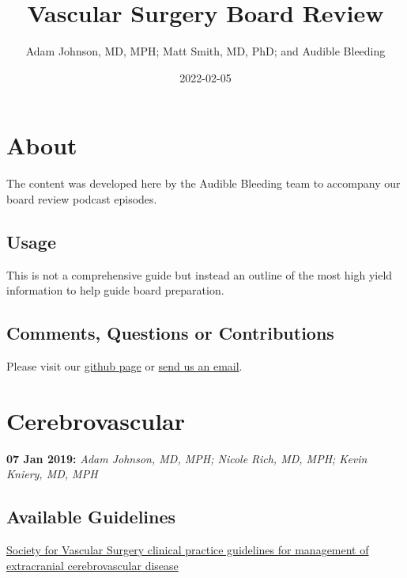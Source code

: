 \documentclass[
]{book}
\title{Vascular Surgery Board Review}
\author{Adam Johnson, MD, MPH; Matt Smith, MD, PhD; and Audible Bleeding}
\date{2022-02-05}
\begin{document}
\maketitle

{
\setcounter{tocdepth}{1}
\tableofcontents
}
\hypertarget{about}{%
\chapter{About}\label{about}}

The content was developed here by the Audible Bleeding team to accompany our board review podcast episodes.

\hypertarget{usage}{%
\section{Usage}\label{usage}}

This is not a comprehensive guide but instead an outline of the most high yield information to help guide board preparation.

\hypertarget{comments-questions-or-contributions}{%
\section{Comments, Questions or Contributions}\label{comments-questions-or-contributions}}

Please visit our \href{https://github.com/adam-mdmph/VS-Board-Review}{github page} or \href{mailto:audiblebleeding@vascularsociety.org}{send us an email}.

\hypertarget{cerebrovascular}{%
\chapter{Cerebrovascular}\label{cerebrovascular}}

\textbf{07 Jan 2019:} \emph{Adam Johnson, MD, MPH; Nicole Rich, MD, MPH; Kevin
Kniery, MD, MPH}

\hypertarget{available-guidelines}{%
\section{Available Guidelines}\label{available-guidelines}}

\href{https://www.jvascsurg.org/article/S0741-5214(21)00893-4/fulltext}{Society for Vascular Surgery clinical practice guidelines for
management of extracranial cerebrovascular
disease}
\citep{aburahmaSocietyVascularSurgery2022}
\end{document}
